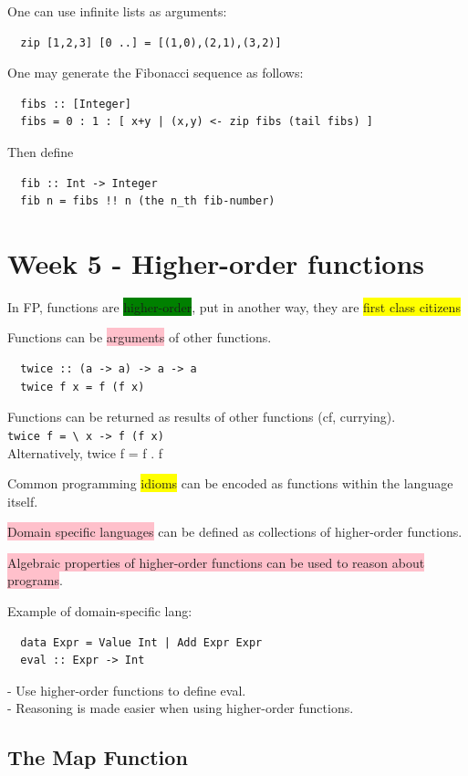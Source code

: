 \documentclass[tikz,border=10pt]{project_plan}
\begin{document}
One can use infinite lists as arguments:
\begin{lstlisting}
  zip [1,2,3] [0 ..] = [(1,0),(2,1),(3,2)]
\end{lstlisting}

One may generate the Fibonacci sequence as follows:
\begin{lstlisting}
  fibs :: [Integer]
  fibs = 0 : 1 : [ x+y | (x,y) <- zip fibs (tail fibs) ]
\end{lstlisting}
Then define
\begin{lstlisting}
  fib :: Int -> Integer
  fib n = fibs !! n (the n_th fib-number)
\end{lstlisting}

\chapter{Week 5 - Higher-order functions}

In FP, functions are \colorbox{green}{higher-order}, put in another way,
they are \colorbox{yellow}{first class citizens}

Functions can be \colorbox{pink}{arguments} of other functions.
\begin{lstlisting}
  twice :: (a -> a) -> a -> a
  twice f x = f (f x)
\end{lstlisting}
Functions can be returned as results of other functions (cf, currying).\\
\lstinline|twice f = \ x -> f (f x)|\\
Alternatively, twice f = f . f

Common programming \colorbox{yellow}{idioms} can be encoded as
functions within the language itself.

\colorbox{pink}{Domain specific languages} can be defined as
collections of higher-order functions.

\colorbox{pink}{Algebraic properties of higher-order functions can be
  used to reason about programs}.

Example of domain-specific lang:
\begin{lstlisting}
  data Expr = Value Int | Add Expr Expr
  eval :: Expr -> Int
\end{lstlisting}
- Use higher-order functions to define eval.\\
- Reasoning is made easier when using higher-order functions.

\section{The Map Function}
\end{document}
